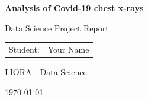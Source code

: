 \begin{titlepage}
    \centering

    \vspace*{2cm}

    {\Huge\bfseries Analysis of Covid-19 chest x-rays
\par}

    \vspace{1.5cm}

    {\Large Data Science Project Report}

    \vspace{2cm}

    \begin{tabular}{ll}
        Student: & Your Name \\
    \end{tabular}

    \vfill

LIORA - Data Science

    \vspace{0.5cm}

    \today

\end{titlepage}